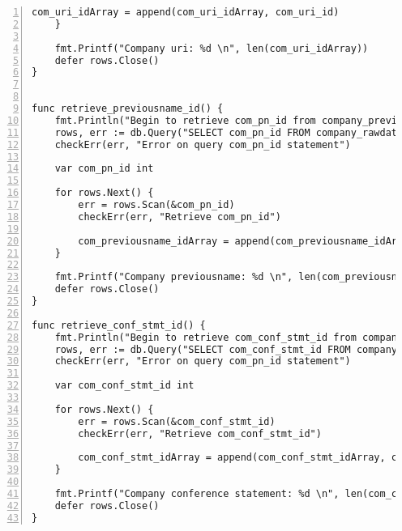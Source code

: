 \begin{lstlisting}[breaklines, frame=single, numbers=left, caption={Resource Table Key Retrieval Function.}, label=commandline-02]
		com_uri_idArray = append(com_uri_idArray, com_uri_id) 
	}
	
	fmt.Printf("Company uri: %d \n", len(com_uri_idArray))
	defer rows.Close()
}


func retrieve_previousname_id() {	
	fmt.Println("Begin to retrieve com_pn_id from company_previousname")
	rows, err := db.Query("SELECT com_pn_id FROM company_rawdata AS raw JOIN company_previousname AS pn ON raw.pn1_condate = pn.com_pn1_condate AND raw.pn1_companyname = pn.com_pn1_companyname AND raw.pn2_condate = pn.com_pn2_condate AND raw.pn2_companyname = pn.com_pn2_companyname AND raw.pn3_condate = pn.com_pn3_condate AND raw.pn3_companyname = pn.com_pn3_companyname AND raw.pn4_condate = pn.com_pn4_condate AND raw.pn4_companyname = pn.com_pn4_companyname AND raw.pn5_condate = pn.com_pn5_condate AND raw.pn5_companyname = pn.com_pn5_companyname AND raw.pn6_condate = pn.com_pn6_condate AND raw.pn6_companyname = pn.com_pn6_companyname AND raw.pn7_condate = pn.com_pn7_condate AND raw.pn7_companyname = pn.com_pn7_companyname AND raw.pn8_condate = pn.com_pn8_condate AND raw.pn8_companyname = pn.com_pn8_companyname AND raw.pn9_condate = pn.com_pn9_condate AND raw.pn9_companyname = pn.com_pn9_companyname AND raw.pn10_condate = pn.com_pn10_condate;")
	checkErr(err, "Error on query com_pn_id statement")
	
	var com_pn_id int 
	
	for rows.Next() {
		err = rows.Scan(&com_pn_id)
		checkErr(err, "Retrieve com_pn_id")
		
		com_previousname_idArray = append(com_previousname_idArray, com_pn_id) 
	}
	
	fmt.Printf("Company previousname: %d \n", len(com_previousname_idArray))
	defer rows.Close()
} 

func retrieve_conf_stmt_id() {	
	fmt.Println("Begin to retrieve com_conf_stmt_id from company_conf_stmt")
	rows, err := db.Query("SELECT com_conf_stmt_id FROM company_conf_stmt AS stmt JOIN company_rawdata AS raw ON stmt.com_conf_stmt_nextduedate = raw.confstmtnextduedate AND stmt.com_conf_stmt_lastmadeupdate = raw.confstmtlastmadeupdate;")
	checkErr(err, "Error on query com_pn_id statement")
	
	var com_conf_stmt_id int 
	
	for rows.Next() {
		err = rows.Scan(&com_conf_stmt_id)
		checkErr(err, "Retrieve com_conf_stmt_id")
		
		com_conf_stmt_idArray = append(com_conf_stmt_idArray, com_conf_stmt_id) 
	}
	
	fmt.Printf("Company conference statement: %d \n", len(com_conf_stmt_idArray))
	defer rows.Close()
}

\end{lstlisting}

